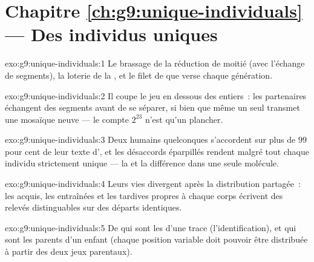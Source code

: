 \section*{Chapitre \ref{ch:g9:unique-individuals} --- Des individus uniques}

\begin{solution}{exo:g9:unique-individuals:1}
Le brassage de la réduction de moitié (avec l'échange de
segments), la loterie de la , et le filet de
 que verse chaque génération.
\end{solution}

\begin{solution}{exo:g9:unique-individuals:2}
Il coupe le jeu en dessous des  entiers~: les
partenaires échangent des segments avant de se séparer, si
bien que même un seul  transmet une mosaïque neuve
--- le compte $2^{23}$ n'est qu'un plancher.
\end{solution}

\begin{solution}{exo:g9:unique-individuals:3}
Deux humains quelconques s'accordent sur plus de $99$ pour
cent de leur texte d', et les désaccords éparpillés
rendent malgré tout chaque individu strictement unique ---
la  et la différence dans une seule molécule.
\end{solution}

\begin{solution}{exo:g9:unique-individuals:4}
Leurs vies divergent après la distribution partagée~: les
 acquis, les  entraînées et les 
tardives propres à chaque corps écrivent des relevés
distinguables sur des départs identiques.
\end{solution}

\begin{solution}{exo:g9:unique-individuals:5}
De qui sont les  d'une trace (l'identification), et
qui sont les parents d'un enfant (chaque position variable
doit pouvoir être distribuée à partir des deux jeux
parentaux).
\end{solution}

